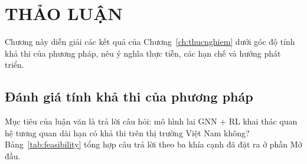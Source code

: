 \chapter{THẢO LUẬN}
\label{ch:thaoluan}

Chương này diễn giải các kết quả của Chương~\ref{ch:thucnghiem} dưới góc độ tính khả thi của phương pháp, nêu ý nghĩa thực tiễn, các hạn chế và hướng phát triển.

\section{Đánh giá tính khả thi của phương pháp}
\label{sec:feasibility}

Mục tiêu của luận văn là trả lời câu hỏi: mô hình lai GNN + RL khai thác quan hệ tương quan dài hạn có khả thi trên thị trường Việt Nam không? Bảng~\ref{tab:feasibility} tổng hợp câu trả lời theo ba khía cạnh đã đặt ra ở phần Mở đầu.

